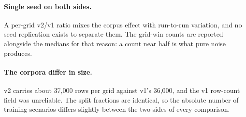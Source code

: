 \documentclass[10pt]{article}
\begin{document}
\paragraph{Single seed on both sides.} A per-grid v2/v1 ratio mixes the corpus
effect with run-to-run variation, and no seed replication exists to separate
them. The grid-win counts are reported alongside the medians for that reason: a
count near half is what pure noise produces.

\paragraph{The corpora differ in size.} v2 carries about 37{,}000 rows per grid
against v1's 36{,}000, and the v1 row-count field was unreliable. The split
fractions are identical, so the absolute number of training scenarios differs
slightly between the two sides of every comparison.
\end{document}
